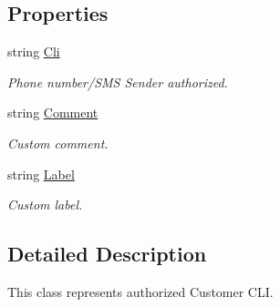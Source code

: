 \subsection*{Properties}
\begin{DoxyCompactItemize}
\item 
string \hyperlink{class_thecallr_api_1_1_objects_1_1_misc_1_1_customer_cli_a24427299f59afd644d2d3d68f8516da3}{Cli}
\begin{DoxyCompactList}\small\item\em Phone number/\+S\+M\+S Sender authorized. \end{DoxyCompactList}\item 
string \hyperlink{class_thecallr_api_1_1_objects_1_1_misc_1_1_customer_cli_a7a499a1a059a4c49fca2ce8164a67d98}{Comment}
\begin{DoxyCompactList}\small\item\em Custom comment. \end{DoxyCompactList}\item 
string \hyperlink{class_thecallr_api_1_1_objects_1_1_misc_1_1_customer_cli_a1bda330a9e54b4ce6f863104fb7fced8}{Label}
\begin{DoxyCompactList}\small\item\em Custom label. \end{DoxyCompactList}\end{DoxyCompactItemize}


\subsection{Detailed Description}
This class represents authorized Customer C\+L\+I. 



